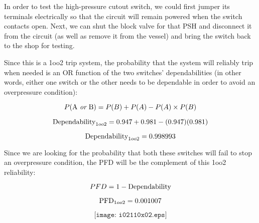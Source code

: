
In order to test the high-pressure cutout switch, we could first jumper its terminals electrically so that the circuit will remain powered when the switch contacts open.  Next, we can shut the block valve for that PSH and disconnect it from the circuit (as well as remove it from the vessel) and bring the switch back to the shop for testing.

\vskip 10pt

Since this is a 1oo2 trip system, the probability that the system will reliably trip when needed is an OR function of the two switches' dependabilities (in other words, either one switch or the other needs to be dependable in order to avoid an overpressure condition):

$$P(\hbox{A {\it or} B}) = P(B) + P(A) - P(A) \times P(B)$$

$$\hbox{Dependability}_{1oo2} = 0.947 + 0.981 - (0.947)(0.981)$$

$$\hbox{Dependability}_{1oo2} = 0.998993$$

Since we are looking for the probability that both these switches will fail to stop an overpressure condition, the PFD will be the complement of this 1oo2 reliability:

$$PFD = 1 - \hbox{Dependability}$$

$$\hbox{PFD}_{1oo2} = 0.001007$$

$$\texttt{[image: i02110x02.eps]}$$




